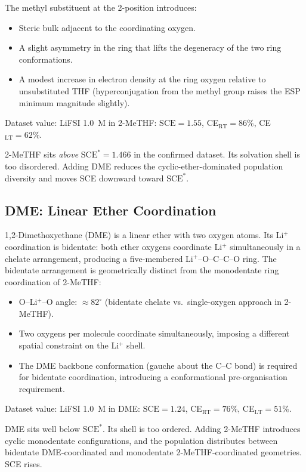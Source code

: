 \documentclass[11pt]{article}
\theoremstyle{plain}
\theoremstyle{definition}
\theoremstyle{remark}
\begin{document}
The methyl substituent at the 2-position introduces:
\begin{itemize}[leftmargin=2em]
  \item Steric bulk adjacent to the coordinating oxygen.
  \item A slight asymmetry in the ring that lifts the degeneracy of the
        two ring conformations.
  \item A modest increase in electron density at the ring oxygen
        relative to unsubstituted THF (hyperconjugation from the
        methyl group raises the ESP minimum magnitude slightly).
\end{itemize}

Dataset value: LiFSI 1.0~M in 2-MeTHF:
$\mathrm{SCE} = 1.55$,
CE$_{\mathrm{RT}} = 86\%$,
CE$_{\mathrm{LT}} = 62\%$.

2-MeTHF sits \emph{above} $\mathrm{SCE}^{*} = 1.466$ in the
confirmed dataset.  Its solvation shell is too disordered.  Adding
DME reduces the cyclic-ether-dominated population diversity and moves
SCE downward toward $\mathrm{SCE}^{*}$.

\subsection{DME: Linear Ether Coordination}

1,2-Dimethoxyethane (DME) is a linear ether with two oxygen atoms.
Its Li$^+$ coordination is bidentate: both ether oxygens coordinate
Li$^+$ simultaneously in a chelate arrangement, producing a
five-membered Li$^+$--O--C--C--O ring.  The bidentate arrangement
is geometrically distinct from the monodentate ring coordination of
2-MeTHF:
\begin{itemize}[leftmargin=2em]
  \item O--Li$^+$--O angle: $\approx 82^\circ$ (bidentate chelate
        vs.\ single-oxygen approach in 2-MeTHF).
  \item Two oxygens per molecule coordinate simultaneously, imposing
        a different spatial constraint on the Li$^+$ shell.
  \item The DME backbone conformation (gauche about the C--C bond)
        is required for bidentate coordination, introducing a
        conformational pre-organisation requirement.
\end{itemize}

Dataset value: LiFSI 1.0~M in DME:
$\mathrm{SCE} = 1.24$,
CE$_{\mathrm{RT}} = 76\%$,
CE$_{\mathrm{LT}} = 51\%$.

DME sits well below $\mathrm{SCE}^{*}$.  Its shell is too ordered.
Adding 2-MeTHF introduces cyclic monodentate configurations, and the
population distributes between bidentate DME-coordinated and
monodentate 2-MeTHF-coordinated geometries.  SCE rises.
\end{document}
